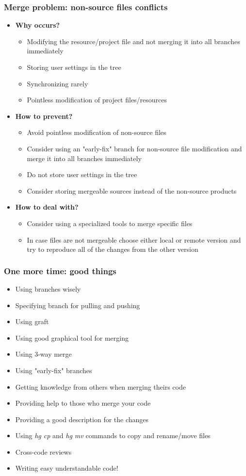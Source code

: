 \documentclass{beamer}
\begin{document}
\begin{frame}
\frametitle{Merge problem: non-source files conflicts}
\begin{itemize}
\item \textbf{Why occurs?}
\begin{itemize}
\item Modifying the resource/project file and not merging it into all branches immediately
\item Storing user settings in the tree
\item Synchronizing rarely
\item Pointless modification of project files/resources
\end{itemize}
\item \textbf{How to prevent?}
\begin{itemize}
\item Avoid pointless modification of non-source files
\item Consider using an "early-fix" branch for non-source file modification and merge it into all branches immediately
\item Do not store user settings in the tree
\item Consider storing mergeable sources instead of the non-source products 
\end{itemize}
\item \textbf{How to deal with?}
\begin{itemize}
\item Consider using a specialized tools to merge specific files
\item In case files are not mergeable choose either local or remote version and try to reproduce all of the changes from the other version
\end{itemize}
\end{itemize}
\end{frame}

\begin{frame}
\frametitle{One more time: good things}
\begin{itemize}
\item Using branches wisely
\item Specifying branch for pulling and pushing
\item Using graft
\item Using good graphical tool for merging
\item Using 3-way merge
\item Using "early-fix" branches
\item Getting knowledge from others when merging theirs code
\item Providing help to those who merge your code
\item Providing a good description for the changes
\item Using \textit{hg cp} and \textit{hg mv} commands to copy and rename/move files
\item Cross-code reviews
\item Writing easy understandable code!
\end{itemize}
\end{frame}
\end{document}

